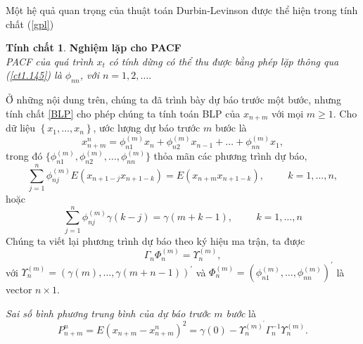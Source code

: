 \documentclass[12pt, a4paper,oneside]{book}
\theoremstyle{definition}
\newtheorem{tc}[theo]{Tính chất}
\begin{document}
Một hệ quả quan trọng của thuật toán Durbin-Levinson được thể hiện trong tính chất (\ref{gpl})\begin{tc}\cite{8} \textbf{\label{gpl}Nghiệm lặp cho PACF}\\
	\textit{PACF của quá trình $x_{t}$ có tính dừng có thể thu được bằng phép lặp thông qua (\ref{ct1.145}) là $\phi_{nn}$, với $n= 1, 2, \dots .$}
\end{tc}

Ở những nội dung trên, chúng ta đã trình bày dự báo trước một bước, nhưng tính chất \ref{BLP} cho phép chúng ta tính toán BLP của $x_{n+m}$ với mọi $m \geq 1$. Cho dữ liệu $\left\lbrace x_{1}, \dots, x_{n}\right\rbrace$, ước lượng dự báo trước $m$ bước là
\begin{equation}
x_{n+m}^{n}= \phi_{n1}^{(m)}x_{n} + \phi_{n2}^{(m)}x_{n-1}+ \dots+ \phi_{nn}^{(m)}x_{1}, \label{ct1.147}
\end{equation}	
trong đó $\{\phi_{n1}^{(m)}, \phi_{n2}^{(m)}, \dots, \phi_{nn}^{(m)}\}$ thỏa mãn các phương trình dự báo,
$$\sum_{j=1}^{n}\phi_{nj}^{(m)}E(x_{n+1-j}x_{n+1-k})= E (x_{n+m}x_{n+1-k}),\hspace{1cm} k= 1, \dots, n,$$
hoặc 
\begin{equation}
\sum_{j=1}^{n}\phi_{nj}^{(m)}\gamma(k-j)=\gamma(m+k-1), \hspace{1cm} k=1, \dots, n \label{ct1.149}
\end{equation}	 
Chúng ta viết lại phương trình dự báo theo ký hiệu ma trận, ta được
\begin{equation}
\Gamma_{n}\varPhi_{n}^{(m)}= \varUpsilon_{n}^{(m)}, \label{ct1.150}
\end{equation}
với $\varUpsilon_{n}^{(m)}= (\gamma(m), \dots, \gamma(m+n-1))^{'}$
và $\varPhi_{n}^{(m)} = (\phi_{n1}^{(m)}, \dots, \phi_{nn}^{(m)})^{'}$ là vector $n\times 1$.

\textit{Sai số bình phương trung bình của dự báo trước $m$ bước} là
\begin{equation}
P_{n+m}^{n} = E (x_{n+m}- x_{n+m}^{n})^{2} = \gamma(0) - \varUpsilon_{n}^{(m)^{'}}\Gamma_{n}^{-1}\varUpsilon_{n}^{(m)}. \label{ct1.151}
\end{equation}
\end{document}
